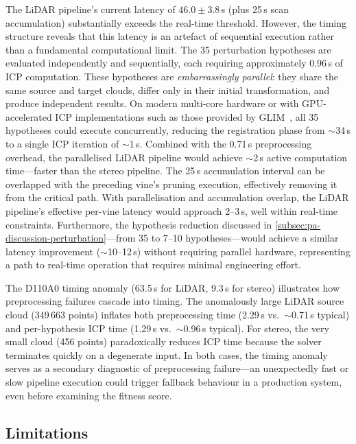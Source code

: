 The LiDAR pipeline's current latency of $46.0 \pm 3.8$\,s (plus 25\,s scan accumulation) substantially exceeds the real-time threshold. However, the timing structure reveals that this latency is an artefact of sequential execution rather than a fundamental computational limit. The 35 perturbation hypotheses are evaluated independently and sequentially, each requiring approximately 0.96\,s of ICP computation. These hypotheses are \emph{embarrassingly parallel}: they share the same source and target clouds, differ only in their initial transformation, and produce independent results. On modern multi-core hardware or with GPU-accelerated ICP implementations such as those provided by GLIM~\cite{koideGLIM3DRangeInertial2024}, all 35 hypotheses could execute concurrently, reducing the registration phase from $\sim$34\,s to a single ICP iteration of $\sim$1\,s. Combined with the 0.71\,s preprocessing overhead, the parallelised LiDAR pipeline would achieve $\sim$2\,s active computation time---faster than the stereo pipeline. The 25\,s accumulation interval can be overlapped with the preceding vine's pruning execution, effectively removing it from the critical path. With parallelisation and accumulation overlap, the LiDAR pipeline's effective per-vine latency would approach 2--3\,s, well within real-time constraints. Furthermore, the hypothesis reduction discussed in \cref{subsec:pa-discussion-perturbation}---from 35 to 7--10 hypotheses---would achieve a similar latency improvement ($\sim$10--12\,s) without requiring parallel hardware, representing a path to real-time operation that requires minimal engineering effort.

The D110A0 timing anomaly (63.5\,s for LiDAR, 9.3\,s for stereo) illustrates how preprocessing failures cascade into timing. The anomalously large LiDAR source cloud (349\,663 points) inflates both preprocessing time (2.29\,s vs.\ $\sim$0.71\,s typical) and per-hypothesis ICP time (1.29\,s vs.\ $\sim$0.96\,s typical). For stereo, the very small cloud (456 points) paradoxically reduces ICP time because the solver terminates quickly on a degenerate input. In both cases, the timing anomaly serves as a secondary diagnostic of preprocessing failure---an unexpectedly fast or slow pipeline execution could trigger fallback behaviour in a production system, even before examining the fitness score.

\subsection{Limitations}
\label{subsec:pa-discussion-limitations}

